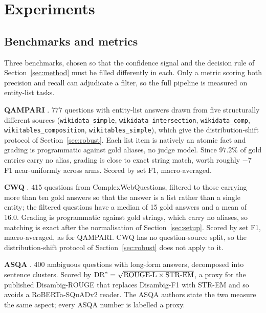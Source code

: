 \documentclass{article}
\begin{document}
\section{Experiments}
\label{sec:experiments}

\subsection{Benchmarks and metrics}
\label{sec:metrics}

Three benchmarks, chosen so that the confidence signal and the decision rule of Section~\ref{sec:method} must be filled differently in each. Only a metric scoring both precision and recall can adjudicate a filter, so the full pipeline is measured on entity-list tasks.

\textbf{QAMPARI} \cite{amouyal2022qampari}. 777 questions with entity-list answers drawn from five structurally different sources (\texttt{wikidata\_simple}, \texttt{wikidata\_intersection}, \texttt{wikidata\_comp}, \texttt{wikitables\_composition}, \texttt{wikitables\_simple}), which give the distribution-shift protocol of Section~\ref{sec:robust}.
Each list item is natively an atomic fact and grading is programmatic against gold aliases, no judge model. Since $97.2\%$ of gold entries carry no alias, grading is close to exact string match, worth roughly $-7$ F1 near-uniformly across arms. Scored by set F1, macro-averaged.

\textbf{CWQ} \cite{talmor2018web}. 415 questions from ComplexWebQuestions, filtered to those carrying more than ten gold answers so that the answer is a list rather than a single entity; the filtered questions have a median of 15 gold answers and a mean of 16.0. Grading is programmatic against gold strings, which carry no aliases, so matching is exact after the normalisation of Section~\ref{sec:setup}. Scored by set F1, macro-averaged, as for QAMPARI. CWQ has no question-source split, so the distribution-shift protocol of Section~\ref{sec:robust} does not apply to it.

\textbf{ASQA} \cite{stelmakh2022asqa}. 400 ambiguous questions with long-form answers, decomposed into sentence clusters. Scored by $\mathrm{DR}^* = \sqrt{\mathrm{ROUGE\text-L} \times \mathrm{STR\text-EM}}$, a proxy for the published Disambig-ROUGE that replaces Disambig-F1 with STR-EM and so avoids a RoBERTa-SQuADv2 reader. The ASQA authors state the two measure the same aspect; every ASQA number is labelled a proxy.
\end{document}
